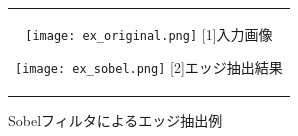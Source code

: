 \documentclass[../Thesis]{subfiles}
\begin{document}
  \begin{figure}[tbp]
  \begin{center}
    \begin{tabular}{c}
      \begin{minipage}{0.5\hsize}
        \begin{center}
          \texttt{[image: ex\_original.png]}
          \hspace{1.6cm} [1]入力画像
        \end{center}
      \end{minipage}
      \begin{minipage}{0.5\hsize}
        \begin{center}
          \texttt{[image: ex\_sobel.png]}
          \hspace{1.6cm} [2]エッジ抽出結果
        \end{center}
      \end{minipage}
    \end{tabular}
    \caption{Sobelフィルタによるエッジ抽出例}
    \label{img05}
  \end{center}
  \end{figure}



\end{document}
